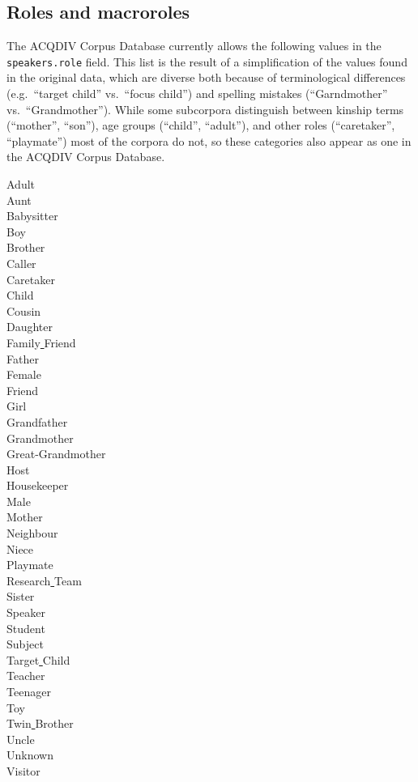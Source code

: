 \documentclass[a4paper, 11pt]{book}
\newcommand{\und}{\underline{{ }}\hspace{0.2mm}}	%
\begin{document}
\subsection{Roles and macroroles}
\label{subsec:Roles and macroroles}

The ACQDIV Corpus Database currently allows the following values in the \texttt{speakers.role} field. This list is the result of a simplification of the values found in the original data, which are diverse both because of terminological differences (e.g.\ “target child” vs.\ “focus child”) and spelling mistakes (“Garndmother” vs.\ “Grandmother”). While some subcorpora distinguish between kinship terms (“mother”, “son”), age groups (“child”, “adult”), and other roles (“caretaker”, “playmate”) most of the corpora do not, so these categories also appear as one in the ACQDIV Corpus Database. 

\begin{multicols}{4}
	\noindent Adult \\
	Aunt \\
	Babysitter \\
	Boy \\
	Brother \\
	Caller \\
	Caretaker \\
	Child \\
	Cousin \\
	Daughter \\
	Family\und Friend \\
	Father \\
	Female \\
	Friend \\
	Girl \\
	Grandfather \\
	Grandmother \\
	Great-Grandmother \\
	Host \\
	Housekeeper \\
	Male \\
	Mother \\
	Neighbour \\
	Niece \\
	Playmate \\
	Research\und Team \\
	Sister \\
	Speaker \\
	Student \\
	Subject \\
	Target\und Child \\
	Teacher \\
	Teenager \\
	Toy \\
	Twin\und Brother \\
	Uncle \\
	Unknown \\
	Visitor \\
\end{multicols}
\end{document}
